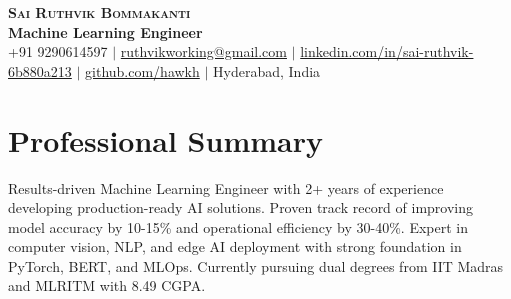 \documentclass[letterpaper,10.8pt]{article}
\begin{document}
\begin{center}
    \textbf{\Large \scshape Sai Ruthvik Bommakanti} \\ \vspace{1pt}
    \textbf{Machine Learning Engineer} \\ \vspace{1pt}
    \small +91 9290614597 $|$ \href{mailto:ruthvikworking@gmail.com}{ruthvikworking@gmail.com} $|$ 
    \href{https://linkedin.com/in/sai-ruthvik-6b880a213}{linkedin.com/in/sai-ruthvik-6b880a213} $|$
    \href{https://github.com/hawkh}{github.com/hawkh} $|$ Hyderabad, India
\end{center}

\section{Professional Summary}
\small{Results-driven Machine Learning Engineer with 2+ years of experience developing production-ready AI solutions. Proven track record of improving model accuracy by 10-15\% and operational efficiency by 30-40\%. Expert in computer vision, NLP, and edge AI deployment with strong foundation in PyTorch, BERT, and MLOps. Currently pursuing dual degrees from IIT Madras and MLRITM with 8.49 CGPA.}

\end{document}
